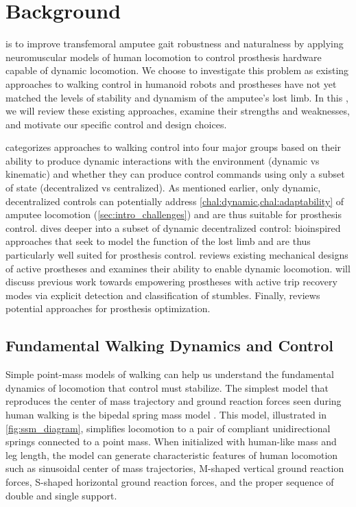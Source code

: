 \chapter{Background}\label{sec:back}
 is to improve transfemoral amputee
gait robustness and naturalness by applying neuromuscular models of human
locomotion to control prosthesis hardware capable of dynamic locomotion. We
choose to investigate this problem as existing approaches to walking control in
humanoid robots and prostheses have not yet matched the levels of stability and
dynamism of the amputee's lost limb. In this , we will review
these existing approaches, examine their strengths and weaknesses, and motivate
our specific control and design choices.

 categorizes approaches to walking control into
four major groups based on their ability to produce dynamic interactions with
the environment (dynamic vs kinematic) and whether they can produce control
commands using only a subset of state (decentralized vs centralized). As
mentioned earlier, only dynamic, decentralized controls can potentially address
\cref{chal:dynamic,chal:adaptability} of amputee locomotion
(\cref{sec:intro_challenges}) and are thus suitable for prosthesis control.
 dives deeper into a subset of dynamic
decentralized control: bioinspired approaches that seek to model the function of
the lost limb and are thus particularly well suited for prosthesis control.
 reviews existing mechanical designs of active
prostheses and examines their ability to enable dynamic locomotion.
 will discuss previous work towards empowering
prostheses with active trip recovery modes via explicit detection and
classification of stumbles. Finally,  reviews
potential approaches for prosthesis optimization.

\section{Fundamental Walking Dynamics and
Control}\label{sec:back_walking_review}

Simple point-mass models of walking can help us understand the fundamental
dynamics of locomotion that control must stabilize.  The simplest model that
reproduces the center of mass trajectory and ground reaction forces seen during
human walking is the bipedal spring mass model \citep{geyer2006compliant}. This
model, illustrated in \cref{fig:ssm_diagram}, simplifies locomotion to a pair of
compliant unidirectional springs connected to a point mass. When initialized
with human-like mass and leg length, the model can generate characteristic
features of human locomotion such as sinusoidal center of mass trajectories,
M-shaped vertical ground reaction forces, S-shaped horizontal ground reaction
forces, and the proper sequence of double and single support. 

